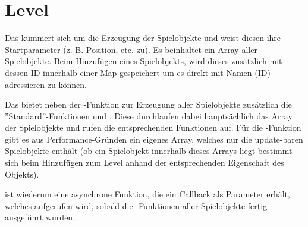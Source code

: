 \chapter{Level}

Das  kümmert sich um die Erzeugung der Spielobjekte und weist diesen ihre Startparameter (z. B. Position, etc. zu). Es beinhaltet ein Array aller Spielobjekte. Beim Hinzufügen eines Spielobjekts, wird dieses zusätzlich mit dessen ID innerhalb einer Map gespeichert um es direkt mit Namen (ID) adressieren zu können.

Das  bietet neben der -Funktion zur Erzeugung aller Spielobjekte zusätzlich die ''Standard''-Funktionen  und . Diese durchlaufen dabei hauptsächlich das Array der Spielobjekte und rufen die entsprechenden Funktionen auf. Für die -Funktion gibt es aus Performance-Gründen ein eigenes Array, welches nur die update-baren Spielobjekte enthält (ob ein Spielobjekt innerhalb dieses Arrays liegt bestimmt sich beim Hinzufügen zum Level anhand der entsprechenden Eigenschaft des Objekts).

 ist wiederum eine asynchrone Funktion, die ein Callback als Parameter erhält, welches aufgerufen wird, sobald die -Funktionen aller Spielobjekte fertig ausgeführt wurden. 